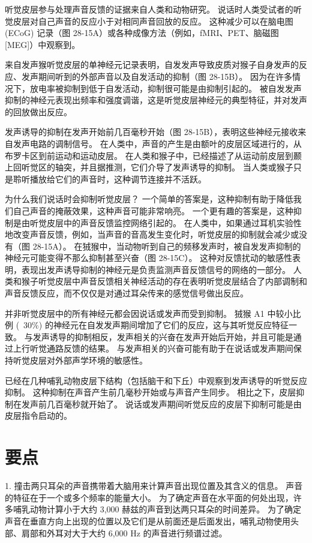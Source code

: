 听觉皮层参与处理声音反馈的证据来自人类和动物研究。 说话时人类受试者的听觉皮层对自己声音的反应小于对相同声音回放的反应。 这种减少可以在脑电图 (ECoG) 记录（图 28-15A）或各种成像方法（例如，fMRI、PET、脑磁图 [MEG]）中观察到。

来自发声猴听觉皮层的单神经元记录表明，自发发声导致皮质对猴子自身发声的反应、发声期间听到的外部声音以及自发活动的抑制（图 28-15B）。 因为在许多情况下，放电率被抑制到低于自发活动，抑制很可能是由抑制引起的。 被自发发声抑制的神经元表现出频率和强度调谐，这是听觉皮层神经元的典型特征，并对发声的回放做出反应。

发声诱导的抑制在发声开始前几百毫秒开始（图 28-15B），表明这些神经元接收来自发声电路的调制信号。 在人类中，声音的产生是由额叶的皮层区域进行的，从布罗卡区到前运动和运动皮层。 在人类和猴子中，已经描述了从运动前皮层到颞上回听觉区的轴突，并且据推测，它们介导了发声诱导的抑制。 当人类或猴子只是聆听播放给它们的声音时，这种调节连接并不活跃。

为什么我们说话时会抑制听觉皮层？ 一个简单的答案是，这种抑制有助于降低我们自己声音的掩蔽效果，这种声音可能非常响亮。 一个更有趣的答案是，这种抑制是由听觉皮层中的声音反馈监控网络引起的。 在人类中，如果通过耳机实验性地改变声音反馈，例如，当声音的音高发生变化时，听觉皮层的抑制就会减少或没有（图 28-15A）。 在狨猴中，当动物听到自己的频移发声时，被自发发声抑制的神经元可能变得不那么抑制甚至兴奋（图 28-15C）。 这种对反馈扰动的敏感性表明，表现出发声诱导抑制的神经元是负责监测声音反馈信号的网络的一部分。 人类和猴子听觉皮层中声音反馈相关神经活动的存在表明听觉皮层结合了内部调制和声音反馈反应，而不仅仅是对通过耳朵传来的感觉信号做出反应。

并非听觉皮层中的所有神经元都会因说话或发声而受到抑制。 狨猴 A1 中较小比例 (~30\%) 的神经元在自发发声期间增加了它们的反应，这与其听觉反应特征一致。 与发声诱导的抑制相反，发声相关的兴奋在发声开始后开始，并且可能是通过上行听觉通路反馈的结果。 与发声相关的兴奋可能有助于在说话或发声期间保持听觉皮层对外部声学环境的敏感性。

已经在几种哺乳动物皮层下结构（包括脑干和下丘）中观察到发声诱导的听觉反应抑制。 这种抑制在声音产生前几毫秒开始或与声音产生同步。 相比之下，皮层抑制在发声前几百毫秒就开始了。 说话或发声期间听觉反应的皮层下抑制可能是由皮层指令启动的。


\section{要点}
1. 撞击两只耳朵的声音携带着大脑用来计算声音出现位置及其含义的信息。 声音的特征在于一个或多个频率的能量大小。 为了确定声音在水平面的何处出现，许多哺乳动物计算小于大约 3,000 赫兹的声音到达两只耳朵的时间差异。 为了确定声音在垂直方向上出现的位置以及它们是从前面还是后面发出，哺乳动物使用头部、肩部和外耳对大于大约 6,000 Hz 的声音进行频谱过滤。 

